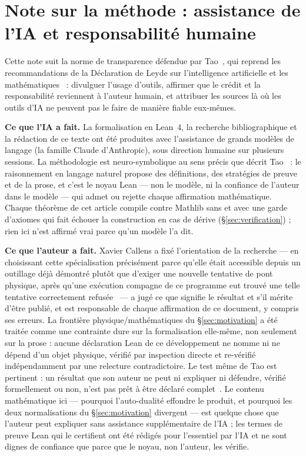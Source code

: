 \documentclass[11pt, a4paper]{article}
\newcommand{\lean}[1]{\ifmmode\text{\ttfamily\detokenize{#1}}\else{\ttfamily\detokenize{#1}}\fi}
\theoremstyle{remark}
\begin{document}
\section*{Note sur la méthode : assistance de l'IA et responsabilité humaine}

Cette note suit la norme de transparence défendue par Tao~\cite{Tao2026AI}, qui reprend les
recommandations de la Déclaration de Leyde sur l'intelligence artificielle et les
mathématiques~\cite{Leiden2026} : divulguer l'usage d'outils, affirmer que le crédit et la
responsabilité reviennent à l'auteur humain, et attribuer les sources là où les outils d'IA ne
peuvent pas le faire de manière fiable eux-mêmes.

\textbf{Ce que l'IA a fait.} La formalisation en Lean~4, la recherche bibliographique et la
rédaction de ce texte ont été produites avec l'assistance de grands modèles de langage (la famille
Claude d'Anthropic), sous direction humaine sur plusieurs sessions. La méthodologie est
neuro-symbolique au sens précis que décrit Tao~\cite{Tao2026AI} : le raisonnement en langage
naturel propose des définitions, des stratégies de preuve et de la prose, et c'est le noyau Lean
--- non le modèle, ni la confiance de l'auteur dans le modèle --- qui admet ou rejette chaque
affirmation mathématique. Chaque théorème de cet article compile contre Mathlib sans \lean{sorry}
et avec une garde d'axiomes qui fait échouer la construction en cas de dérive
(\S\ref{sec:verification}) ; rien ici n'est affirmé vrai parce qu'un modèle l'a dit.

\textbf{Ce que l'auteur a fait.} Xavier Callens a fixé l'orientation de la recherche --- en
choisissant cette spécialisation précisément parce qu'elle était accessible depuis un outillage
déjà démontré plutôt que d'exiger une nouvelle tentative de pont physique, après qu'une exécution
compagne de ce programme eut trouvé une telle tentative correctement refusée~\cite{Fricke2026}
--- a jugé ce que signifie le résultat et s'il mérite d'être publié, et est responsable de chaque
affirmation de ce document, y compris ses erreurs. La frontière physique/mathématiques du
\S\ref{sec:motivation} a été traitée comme une contrainte dure sur la formalisation elle-même, non
seulement sur la prose : aucune déclaration Lean de ce développement ne nomme ni ne dépend d'un
objet physique, vérifié par inspection directe et re-vérifié indépendamment par une relecture
contradictoire. Le test même de Tao est pertinent : un résultat que son auteur ne peut ni
expliquer ni défendre, vérifié formellement ou non, n'est pas prêt à être déclaré
complet~\cite{Tao2026AI}. Le contenu mathématique ici --- pourquoi l'auto-dualité effondre le
produit, et pourquoi les deux normalisations du \S\ref{sec:motivation} divergent --- est quelque
chose que l'auteur peut expliquer sans assistance supplémentaire de l'IA ; les termes de preuve
Lean qui le certifient ont été rédigés pour l'essentiel par l'IA et ne sont dignes de confiance
que parce que le noyau, non l'auteur, les vérifie.
\end{document}
